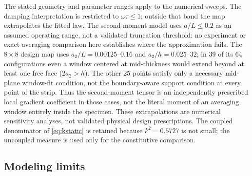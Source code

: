 The stated geometry and parameter ranges apply to the numerical sweeps. The damping interpretation is restricted to
$\omega\tau\le1$; outside that band the map extrapolates the fitted law.
The second-moment model uses $a/L\le0.2$ as an assumed operating range,
not a validated truncation threshold: no experiment or exact averaging
comparison here establishes where the approximation fails. The $8\times8$
design map uses $a_2/L=0.00125$--$0.16$ and $a_2/h=0.025$--$32$; in 39 of
its 64 configurations even a window centered at mid-thickness would extend
beyond at least one free face ($2a_2>h$). The other 25 points satisfy only
a necessary mid-plane window-fit condition, not the boundary-aware support
condition at every point of the strip. Thus the second-moment tensor is
an independently prescribed local gradient coefficient in those cases,
not the literal moment of an averaging window entirely inside the specimen.
These extrapolations are numerical sensitivity analyses, not validated
physical design prescriptions. The coupled
denominator of \eqref{eq:kstatic} is retained because $k^2=0.5727$ is not
small; the uncoupled measure is used only for the constitutive comparison.

\subsection{Modeling limits}
\label{sec:limitations}

